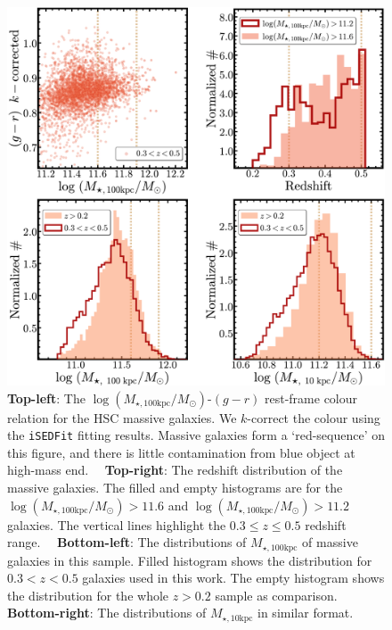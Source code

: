 \documentclass[fleqn,usenatbib]{mnras}
\def\minn{{$M_{\star,10\mathrm{kpc}}$}}
\def\mtot{{$M_{\star,100\mathrm{kpc}}$}}
\def\logmtot{{$\log (M_{\star,100\mathrm{kpc}}/M_{\odot})$}}
\begin{document}
  \begin{figure}
      \centering 
      \includegraphics[width=\columnwidth]{fig/redbcg_sample_stats}
      \caption{
          \textbf{Top-left}: The \logmtot{}-$(g-r)$ rest-frame colour relation for the 
          HSC massive galaxies.
          We $k$-correct the colour using the \texttt{iSEDFit} fitting results.
          Massive galaxies form a `red-sequence' on this figure, and there is 
          little contamination from blue object at high-mass end.~~          
          \textbf{Top-right}: The redshift distribution of the massive galaxies. 
          The filled and empty histograms are for the \logmtot{}$>11.6$ and 
          \logmtot{}$>11.2$ galaxies.
          The vertical lines highlight the $0.3\leq z \leq 0.5$ redshift range.~~
          \textbf{Bottom-left}: The distributions of \mtot{} of massive galaxies in 
          this sample. 
          Filled histogram shows the distribution for $0.3 < z < 0.5$ galaxies 
          used in this work. 
          The empty histogram shows the distribution for the whole $z>0.2$ sample
          as comparison.~~
          \textbf{Bottom-right}: The distributions of \minn{} in similar format. 
      }
      \label{fig:sample_stats}
  \end{figure}
  
\end{document}
